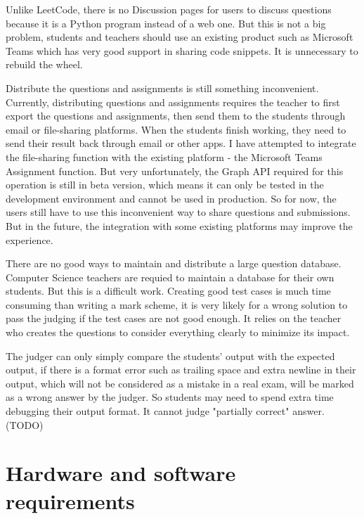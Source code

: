 \documentclass[a4paper]{report}
\begin{document}
Unlike LeetCode, there is no Discussion pages for users to discuss questions because it is a Python program instead of a web one. But this is not a big problem, students and teachers should use an existing product such as Microsoft Teams which has very good support in sharing code snippets. It is unnecessary to rebuild the wheel.

Distribute the questions and assignments is still something inconvenient. Currently, distributing questions and assignments requires the teacher to first export the questions and assignments, then send them to the students through email or file-sharing platforms. When the students finish working, they need to send their result back through email or other apps. I have attempted to integrate the file-sharing function with the existing platform - the Microsoft Teams Assignment function. But very unfortunately, the Graph API required for this operation is still in beta version, which means it can only be tested in the development environment and cannot be used in production. So for now, the users still have to use this inconvenient way to share questions and submissions. But in the future, the integration with some existing platforms may improve the experience.

There are no good ways to maintain and distribute a large question database. Computer Science teachers are requied to maintain a database for their own students. But this is a difficult work. Creating good test cases is much time consuming than writing a mark scheme, it is very likely for a wrong solution to pass the judging if the test cases are not good enough. It relies on the teacher who creates the questions to consider everything clearly to minimize its impact.

The judger can only simply compare the students' output with the expected output, if there is a format error such as trailing space and extra newline in their output, which will not be considered as a mistake in a real exam, will be marked as a wrong answer by the judger. So students may need to spend extra time debugging their output format. It cannot judge "partially correct" answer. (TODO)

\section{Hardware and software requirements}
\end{document}

